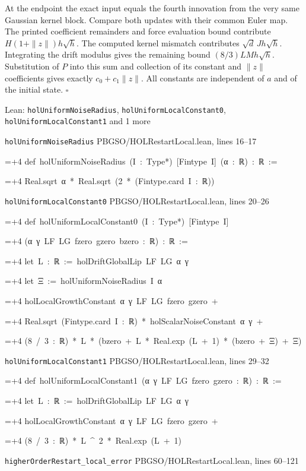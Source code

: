 \documentclass[11pt,a4paper]{report}
\newlength{\leancharwidth}
\newenvironment{leancode}{\par\smallskip\begingroup\ttfamily\footnotesize\raggedright
  \settowidth{\leancharwidth}{M}\setlength{\parskip}{0pt}\setlength{\parindent}{0pt}
  \frenchspacing}{\par\endgroup\smallskip}
\newcommand{\leanline}[2]{\hangindent=\dimexpr#1\leancharwidth+4\leancharwidth\relax
  \hangafter=1\noindent\hspace*{#1\leancharwidth}#2\par}
\newcommand{\leansource}[1]{\par{\footnotesize\color{leanmuted}#1}\par}
\begin{document}
At the endpoint the exact input equals the fourth innovation from the very same Gaussian kernel block. Compare both updates with their common Euler map. The printed coefficient remainders and force evaluation bound contribute \(H(1+\|z\|)h\sqrt h\). The computed kernel mismatch contributes \(\sqrt d\,Jh\sqrt h\). Integrating the drift modulus gives the remaining bound \((8/3)LMh\sqrt h\). Substitution of \(P\) into this sum and collection of its constant and \(\|z\|\) coefficients gives exactly \(c_0+c_1\|z\|\). All constants are independent of \(a\) and of the initial state. \(\square\)

\begin{leanbox}{Lean: \texttt{holUniformNoiseRadius}, \texttt{holUniformLocalConstant0}, \texttt{holUniformLocalConstant1} and 1 more}
\leansource{\texttt{holUniformNoiseRadius} \quad PBGSO/\allowbreak{}HOLRestartLocal.lean, lines 16–17}
\begin{leancode}
\leanline{0}{def\ holUniformNoiseRadius\ (I\ :\ Type*)\ [Fintype\ I]\ (α\ :\ ℝ)\ :\ ℝ\ :=}
\leanline{2}{Real.sqrt\ α\ *\ Real.sqrt\ (2\ *\ (Fintype.card\ I\ :\ ℝ))}
\end{leancode}
\leansource{\texttt{holUniformLocalConstant0} \quad PBGSO/\allowbreak{}HOLRestartLocal.lean, lines 20–26}
\begin{leancode}
\leanline{0}{def\ holUniformLocalConstant0\ (I\ :\ Type*)\ [Fintype\ I]}
\leanline{4}{(α\ γ\ LF\ LG\ fzero\ gzero\ bzero\ :\ ℝ)\ :\ ℝ\ :=}
\leanline{2}{let\ L\ :\ ℝ\ :=\ holDriftGlobalLip\ LF\ LG\ α\ γ}
\leanline{2}{let\ Ξ\ :=\ holUniformNoiseRadius\ I\ α}
\leanline{2}{holLocalGrowthConstant\ α\ γ\ LF\ LG\ fzero\ gzero\ +}
\leanline{4}{Real.sqrt\ (Fintype.card\ I\ :\ ℝ)\ *\ holScalarNoiseConstant\ α\ γ\ +}
\leanline{4}{(8\ /\ 3\ :\ ℝ)\ *\ L\ *\ (bzero\ +\ L\ *\ Real.exp\ (L\ +\ 1)\ *\ (bzero\ +\ Ξ)\ +\ Ξ)}
\end{leancode}
\leansource{\texttt{holUniformLocalConstant1} \quad PBGSO/\allowbreak{}HOLRestartLocal.lean, lines 29–32}
\begin{leancode}
\leanline{0}{def\ holUniformLocalConstant1\ (α\ γ\ LF\ LG\ fzero\ gzero\ :\ ℝ)\ :\ ℝ\ :=}
\leanline{2}{let\ L\ :\ ℝ\ :=\ holDriftGlobalLip\ LF\ LG\ α\ γ}
\leanline{2}{holLocalGrowthConstant\ α\ γ\ LF\ LG\ fzero\ gzero\ +}
\leanline{4}{(8\ /\ 3\ :\ ℝ)\ *\ L\ \textasciicircum{}\ 2\ *\ Real.exp\ (L\ +\ 1)}
\end{leancode}
\leansource{\texttt{higherOrderRestart\_\allowbreak{}local\_\allowbreak{}error} \quad PBGSO/\allowbreak{}HOLRestartLocal.lean, lines 60–121}
\begin{leancode}

\end{leancode}
\end{leanbox}
\end{document}
